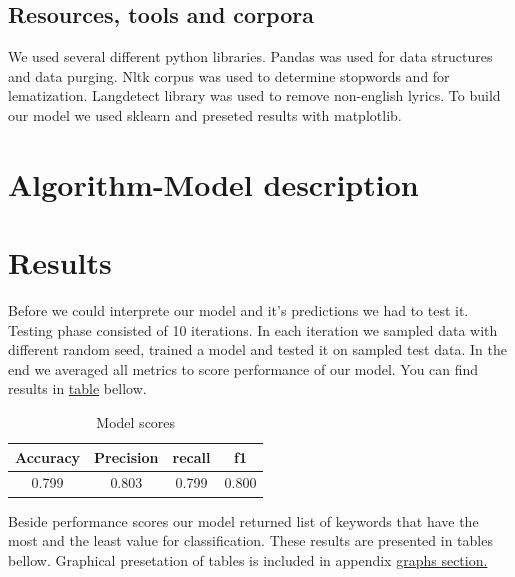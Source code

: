 \documentclass[a4paper,11pt]{article}
\begin{document}
\subsection{Resources, tools and corpora}

We used several different python libraries. Pandas was used for data structures and data purging. Nltk corpus was used to determine stopwords and for lematization. Langdetect library was used to remove non-english lyrics. To build our model we used sklearn and preseted results with matplotlib.

\section{Algorithm-Model description}

\pagebreak
\section{Results}

Before we could interprete our model and it's predictions we had to test it. Testing phase consisted of 10 iterations. In each iteration we sampled data with different random seed, trained a model and tested it on sampled test data. In the end we averaged all metrics to score performance of our model. You can find results in \hyperref[label-model-score]{table} bellow.

\begin{table}[h!]
\centering
\label{baseline}
\begin{tabular}{cccc}
\hline
Accuracy & Precision & recall & f1 \\
\hline
0.799 & 0.803 & 0.799 & 0.800 \\
\end{tabular}
\label{label-model-score}
\caption{Model scores}
\end{table}

Beside performance scores our model returned list of keywords that have the most and the least value for classification. These results are presented in tables bellow. Graphical presetation of tables is included in appendix \hyperref[label-graphs]{graphs section.}
\end{document}
